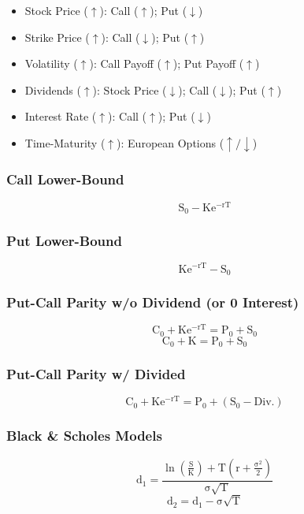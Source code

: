 \documentclass[11pt, english]{article}
\begin{document}
	\begin{itemize}                                                                 
        \setlength\itemsep{0cm}
		\item Stock Price ($\uparrow$): Call ($\uparrow$); Put ($\downarrow$)
		\item Strike Price ($\uparrow$): Call ($\downarrow$); Put ($\uparrow$)
		\item Volatility ($\uparrow$): Call Payoff ($\uparrow$); Put Payoff ($\uparrow$)
		\item Dividends ($\uparrow$): Stock Price ($\downarrow$); Call ($\downarrow$); Put ($\uparrow$)
		\item Interest Rate ($\uparrow$): Call ($\uparrow$); Put ($\downarrow$)
		\item Time-Maturity ($\uparrow$): European Options ($\uparrow/\downarrow$)
	\end{itemize}

		\subsubsection{Call Lower-Bound}

	$$\mathrm{S_0-Ke^{-rT}}$$

		\subsubsection{Put Lower-Bound}

	$$\mathrm{Ke^{-rT}-S_0}$$

		\subsubsection{Put-Call Parity w/o Dividend (or 0 Interest)}

	$$\mathrm{C_0+Ke^{-rT}=P_0+S_0}$$
	$$\mathrm{C_0+K=P_0+S_0}$$

		\subsubsection{Put-Call Parity w/ Divided}

	$$\mathrm{C_0+Ke^{-rT}=P_0+(S_0-Div.)}$$

		\subsubsection{Black \& Scholes Models}

	$$\mathrm{d_1=\frac{\ln\left(\frac{S}{K}\right)+T\left(r+\frac{\sigma^2}{2}\right)}{\sigma\sqrt{T}}}$$
	$$\mathrm{d_2=d_1-\sigma\sqrt{T}}$$
\end{document}
